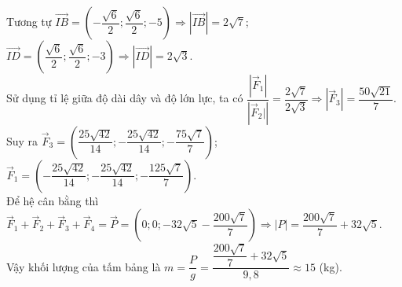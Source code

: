 \begin{bt}
{	Tương tự $\overrightarrow{IB}=\left(-\dfrac{\sqrt{6}}{2}; \dfrac{\sqrt{6}}{2};  -5\right)\Rightarrow \left|\overrightarrow{IB}\right|=2\sqrt{7}$; $\overrightarrow{ID}=\left(\dfrac{\sqrt{6}}{2}; \dfrac{\sqrt{6}}{2}; -3\right)\Rightarrow \left|\overrightarrow{ID}\right|=2\sqrt{3}$.\\
	Sử dụng tỉ lệ giữa độ  dài dây và độ lớn lực, ta có $\dfrac{\left|\overrightarrow{F}_1\right|}{\left|\overrightarrow{F}_2|\right|}=\dfrac{2\sqrt{7}}{2\sqrt{3}}\Rightarrow \left|\overrightarrow{F}_3\right|=\dfrac{50\sqrt{21}}{7}$.\\
	Suy ra  $\overrightarrow{F}_3=\left(\dfrac{25\sqrt{42}}{14}; -\dfrac{25\sqrt{42}}{14}; -\dfrac{75\sqrt{7}}{7}\right)$; $\overrightarrow{F}_1=\left(-\dfrac{25\sqrt{42}}{14}; -\dfrac{25\sqrt{42}}{14}; -\dfrac{125\sqrt{7}}{7}\right)$.\\
	Để hệ cân  bằng thì $\overrightarrow{F}_1+\overrightarrow{F}_2+\overrightarrow{F}_3+\overrightarrow{F}_4=\overrightarrow{P}=\left(0; 0; -32\sqrt{5}-\dfrac{200\sqrt{7}}{7}\right)\Rightarrow \left|P\right|=\dfrac{200\sqrt{7}}{7}+32\sqrt{5}$.\\
	Vậy khối lượng của tấm  bảng là $m=\dfrac{P}{g}=\dfrac{\dfrac{200\sqrt{7}}{7}+32\sqrt{5}}{9{,}8}\approx15$ (kg).
	} 
\end{bt}


